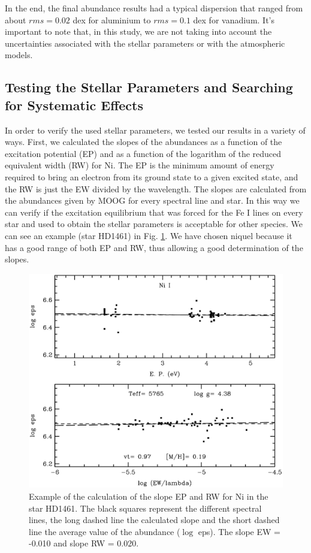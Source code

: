 \documentclass[dvips,12pt,a4paper]{report}
\begin{document}
{{In the end, the final abundance results had a typical dispersion that ranged from about $rms=0.02$ dex for aluminium to $rms=0.1$ dex for vanadium. It's important to note that, in this study, we are not taking into account the uncertainties associated with the stellar parameters or with the atmospheric models.


\subsection {Testing the Stellar Parameters and Searching \\for Systematic Effects}
\label{testpar}
In order to verify the used stellar parameters,  we tested our results in a variety of ways. First, we calculated the slopes of the abundances as a function of the excitation potential (EP) and as a function of the logarithm of the reduced equivalent width (RW) for Ni. The EP is the minimum amount of energy required to bring an electron from its ground state to a given excited state, and the RW is just the EW divided by the wavelength. The slopes are calculated from the abundances given by MOOG for every spectral line and star. In this way we can verify if the excitation equilibrium that was forced for the Fe I lines on every star and used to obtain the stellar parameters \citep{Santos-2000b} is acceptable for other species. We can see an example (star HD1461) in Fig. \ref{exslope}. We have chosen niquel because it has a good range of both EP and RW, thus allowing a good determination of the slopes.

\begin{figure}[h]
\centering
\includegraphics[trim=0mm 0mm 0mm 10mm, clip,width= 10 cm]{pics/parte3/moogpicniq.eps}
\caption[Example of the calculation for Ni of the slope EP and RW]{Example of the calculation of the slope EP and RW for Ni in the star HD1461. The black squares represent the different spectral lines, the long dashed line the calculated slope and the short dashed line the average value of the abundance ($\log$ eps). The slope EW = -0.010 and slope RW = 0.020.}
\label{exslope}
\end{figure}

}}
\end{document}
